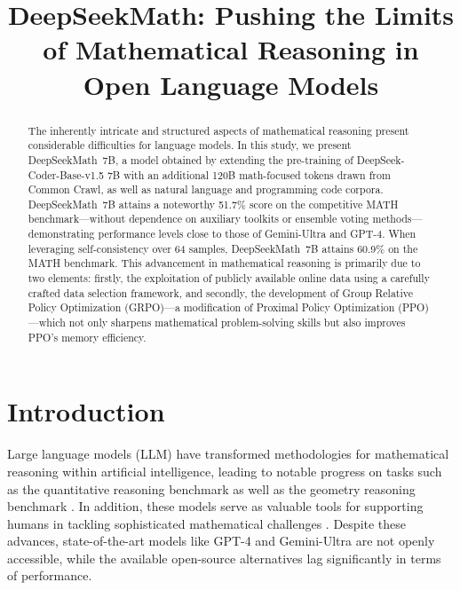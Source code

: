 \title{DeepSeekMath: Pushing the Limits of Mathematical Reasoning in Open Language Models}

\begin{abstract}
The inherently intricate and structured aspects of mathematical reasoning present considerable difficulties for language models. In this study, we present DeepSeekMath~7B, a model obtained by extending the pre-training of DeepSeek-Coder-Base-v1.5 7B with an additional 120B math-focused tokens drawn from Common Crawl, as well as natural language and programming code corpora. DeepSeekMath~7B attains a noteworthy 51.7\% score on the competitive MATH benchmark—without dependence on auxiliary toolkits or ensemble voting methods—demonstrating performance levels close to those of Gemini-Ultra and GPT-4. When leveraging self-consistency over 64 samples, DeepSeekMath~7B attains 60.9\% on the MATH benchmark. This advancement in mathematical reasoning is primarily due to two elements: firstly, the exploitation of publicly available online data using a carefully crafted data selection framework, and secondly, the development of Group Relative Policy Optimization (GRPO)—a modification of Proximal Policy Optimization (PPO)—which not only sharpens mathematical problem-solving skills but also improves PPO’s memory efficiency.
\end{abstract}

\section{Introduction}

Large language models (LLM) have transformed methodologies for mathematical reasoning within artificial intelligence, leading to notable progress on tasks such as the quantitative reasoning benchmark \citep{MATH} as well as the geometry reasoning benchmark \citep{trinh2024solving}. In addition, these models serve as valuable tools for supporting humans in tackling sophisticated mathematical challenges \citep{tao}. Despite these advances, state-of-the-art models like GPT-4 \citep{gpt4} and Gemini-Ultra \citep{gemini} are not openly accessible, while the available open-source alternatives lag significantly in terms of performance.

